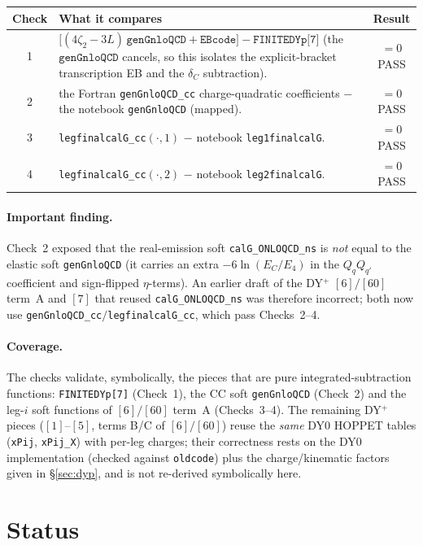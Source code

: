 \documentclass[11pt]{article}
\newcommand{\code}[1]{\texttt{#1}}
\newcommand{\zt}{\ensuremath{\zeta_2}}\newcommand{\ztt}{\ensuremath{\zeta_3}}
\begin{document}
\begin{center}\small
\begin{longtable}{@{}c p{9.5cm} c@{}}
\toprule
\textbf{Check} & \textbf{What it compares} & \textbf{Result}\\
\midrule\endhead
1 & $\big[(4\zt-3L)\,\code{genGnloQCD}+\code{EBcode}\big]-\code{FINITEDYp[7]}$
  (the $\code{genGnloQCD}$ cancels, so this isolates the explicit-bracket
  transcription EB and the $\delta_C$ subtraction). & $=0$ \;PASS\\
2 & the Fortran \code{genGnloQCD\_cc} charge-quadratic coefficients $-$ the notebook
  \code{genGnloQCD} (mapped). & $=0$ \;PASS\\
3 & \code{legfinalcalG\_cc}$(\cdot,1)$ $-$ notebook \code{leg1finalcalG}. & $=0$ \;PASS\\
4 & \code{legfinalcalG\_cc}$(\cdot,2)$ $-$ notebook \code{leg2finalcalG}. & $=0$ \;PASS\\
\bottomrule
\end{longtable}
\end{center}

\paragraph{Important finding.}
Check~2 exposed that the real-emission soft \code{calG\_ONLOQCD\_ns} is \emph{not} equal to the
elastic soft \code{genGnloQCD} (it carries an extra $-6\ln(E_C/E_4)$ in the $Q_qQ_{q'}$
coefficient and sign-flipped $\eta$-terms). An earlier draft of the DY${}^+$ $[6]/[60]$
term~A and $[7]$ that reused \code{calG\_ONLOQCD\_ns} was therefore incorrect; both now use
\code{genGnloQCD\_cc}$/$\code{legfinalcalG\_cc}, which pass Checks~2--4.

\paragraph{Coverage.} The checks validate, symbolically, the pieces that are pure
integrated-subtraction functions: \code{FINITEDYp[7]} (Check~1), the CC soft
\code{genGnloQCD} (Check~2) and the leg-$i$ soft functions of $[6]/[60]$ term~A
(Checks~3--4). The remaining DY${}^+$ pieces ($[1]$--$[5]$, terms B/C of $[6]/[60]$)
reuse the \emph{same} DY0 HOPPET tables (\code{xPij}, \code{xPij\_X}) with per-leg charges;
their correctness rests on the DY0 implementation (checked against \code{oldcode}) plus the
charge/kinematic factors given in \S\ref{sec:dyp}, and is not re-derived symbolically here.

\section{Status}
\end{document}
